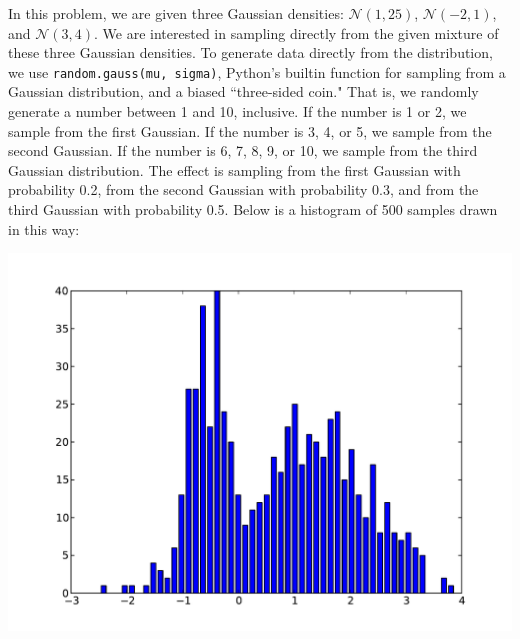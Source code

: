 \documentclass[solution, letterpaper]{cs121}
\begin{document}
\begin{empfile}
\subproblem %
In this problem, we are given three Gaussian densities: $\mathcal{N}(1,25)$, $\mathcal{N}(-2,1)$, and $\mathcal{N}(3,4)$. We are interested in sampling directly from the given mixture of these three Gaussian densities. To generate data directly from the distribution, we use {\tt random.gauss(mu, sigma)}, Python's builtin function for sampling from a Gaussian distribution, and a biased ``three-sided coin." That is, we randomly generate a number between 1 and 10, inclusive. If the number is 1 or 2, we sample from the first Gaussian. If the number is 3, 4, or 5, we sample from the second Gaussian. If the number is 6, 7, 8, 9, or 10, we sample from the third Gaussian distribution. The effect is sampling from the first Gaussian with probability 0.2, from the second Gaussian with probability 0.3, and from the third Gaussian with probability 0.5. Below is a histogram of 500 samples drawn in this way:
\begin{center}
\includegraphics[scale=0.8]{direct-sample-histogram.pdf}
\end{center}


\end{empfile}
\end{document}
